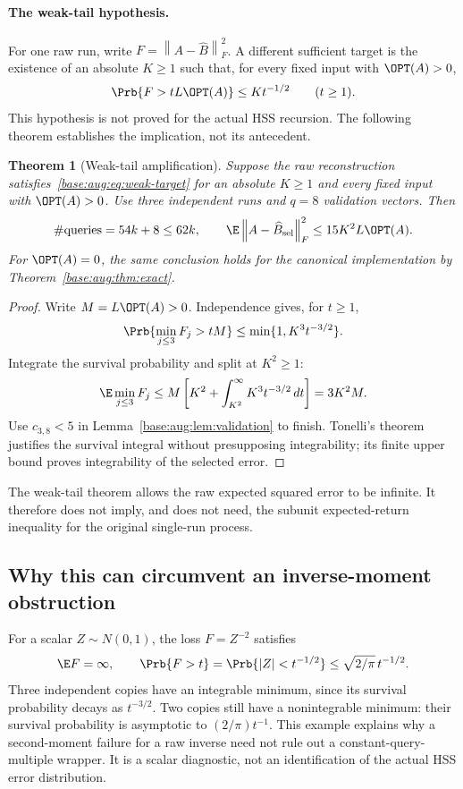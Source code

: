 \documentclass[11pt,oneside,openany,a4paper]{book}
\numberwithin{equation}{chapter}
\newtheorem{theorem}{Theorem}[chapter]
\theoremstyle{definition}
\theoremstyle{remark}
\newcommand{\F}[1]{\left\lVert#1\right\rVert_F}
\begin{document}
\paragraph{The weak-tail hypothesis.}
For one raw run, write $F=\F{A-\widehat B}^2$. A different sufficient
target is the existence of an absolute $K\ge1$ such that, for every fixed
input with $\OPT(A)>0$,
\begin{equation}\label{base:aug:eq:weak-target}
 \Prb\{F>tL\OPT(A)\}\le Kt^{-1/2}\qquad(t\ge1).
\end{equation}
This hypothesis is not proved for the actual HSS recursion. The following
theorem establishes the implication, not its antecedent.

\begin{theorem}[Weak-tail amplification]\label{base:aug:thm:tail}
Suppose the raw reconstruction satisfies~\eqref{base:aug:eq:weak-target} for an
absolute $K\ge1$ and every fixed input with $\OPT(A)>0$. Use three
independent runs and $q=8$ validation vectors. Then
\[
 \#\text{queries}=54k+8\le62k,\qquad
 \E\F{A-\widehat B_{\rm sel}}^2\le15K^2L\OPT(A).
\]
For $\OPT(A)=0$, the same conclusion holds for the canonical implementation
by Theorem~\ref{base:aug:thm:exact}.
\end{theorem}
\begin{proof}
Write $M=L\OPT(A)>0$. Independence gives, for $t\ge1$,
\[
 \Prb\{\min_{j\le3}F_j>tM\}
 \le\min\{1,K^3t^{-3/2}\}.
\]
Integrate the survival probability and split at $K^2\ge1$:
\[
 \E\min_{j\le3}F_j
 \le M\left[K^2+\int_{K^2}^{\infty}K^3t^{-3/2}\,dt\right]
 =3K^2M.
\]
Use $c_{3,8}<5$ in Lemma~\ref{base:aug:lem:validation} to finish. Tonelli's theorem
justifies the survival integral without presupposing integrability; its
finite upper bound proves integrability of the selected error.
\end{proof}

The weak-tail theorem allows the raw expected squared error to be infinite.
It therefore does not imply, and does not need, the subunit
expected-return inequality for the original single-run process.

\subsection{Why this can circumvent an inverse-moment obstruction}
For a scalar $Z\sim N(0,1)$, the loss $F=Z^{-2}$ satisfies
\[
 \E F=\infty,\qquad
 \Prb\{F>t\}=\Prb\{|Z|<t^{-1/2}\}
 \le\sqrt{2/\pi}\,t^{-1/2}.
\]
Three independent copies have an integrable minimum, since its survival
probability decays as $t^{-3/2}$. Two copies still have a nonintegrable
minimum: their survival probability is asymptotic to $(2/\pi)t^{-1}$.
This example explains why a second-moment failure for a raw inverse need
not rule out a constant-query-multiple wrapper. It is a scalar diagnostic,
not an identification of the actual HSS error distribution.
\end{document}
